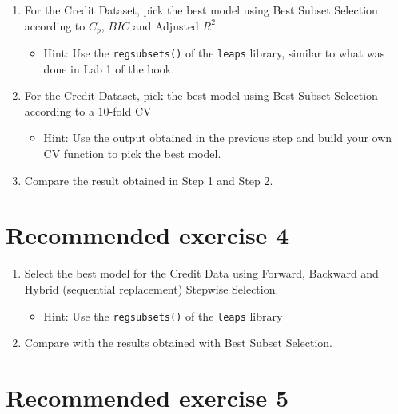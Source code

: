\documentclass[
]{article}
\providecommand{\tightlist}{%
  \setlength{\itemsep}{0pt}\setlength{\parskip}{0pt}}
\begin{document}
\begin{enumerate}
\def\labelenumi{\arabic{enumi}.}
\tightlist
\item
  For the Credit Dataset, pick the best model using Best Subset
  Selection according to \(C_p\), \(BIC\) and Adjusted \(R^2\)

  \begin{itemize}
  \tightlist
  \item
    Hint: Use the \texttt{regsubsets()} of the \texttt{leaps} library,
    similar to what was done in Lab 1 of the book.
  \end{itemize}
\item
  For the Credit Dataset, pick the best model using Best Subset
  Selection according to a \(10\)-fold CV

  \begin{itemize}
  \tightlist
  \item
    Hint: Use the output obtained in the previous step and build your
    own CV function to pick the best model.
  \end{itemize}
\item
  Compare the result obtained in Step 1 and Step 2.
\end{enumerate}

\hypertarget{recommended-exercise-4}{%
\section{Recommended exercise 4}\label{recommended-exercise-4}}

\begin{enumerate}
\def\labelenumi{\arabic{enumi}.}
\tightlist
\item
  Select the best model for the Credit Data using Forward, Backward and
  Hybrid (sequential replacement) Stepwise Selection.

  \begin{itemize}
  \tightlist
  \item
    Hint: Use the \texttt{regsubsets()} of the \texttt{leaps} library
  \end{itemize}
\item
  Compare with the results obtained with Best Subset Selection.
\end{enumerate}

\hypertarget{recommended-exercise-5}{%
\section{Recommended exercise 5}\label{recommended-exercise-5}}
\end{document}
